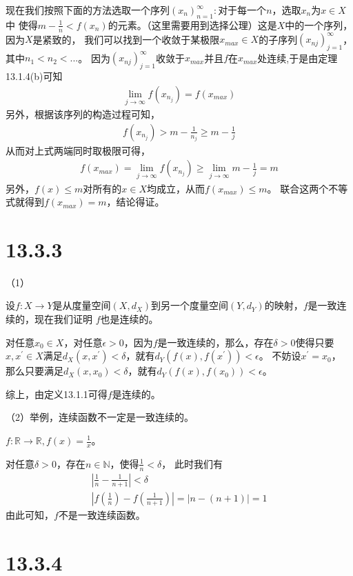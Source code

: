 \documentclass{article}
\begin{document}
现在我们按照下面的方法选取一个序列$(x_n)_{n = 1}^\infty :$对于每一个$n$，选取$x_n$为$x \in X$中
使得$m - \frac{1}{n} < f(x_n)$的元素。（这里需要用到选择公理）这是$X$中的一个序列，因为$X$是紧致的，
我们可以找到一个收敛于某极限$x_{max} \in X$的子序列$(x_{nj})_{j = 1}^\infty$，其中$n_1 < n_2 < ...$。
因为$(x_{nj})_{j = 1}^\infty$收敛于$x_{max}$并且$f$在$x_{max}$处连续,于是由定理13.1.4(b)可知
\begin{align*}
  \lim\limits_{j \to \infty}f(x_{n_j}) = f(x_{max})
\end{align*}
另外，根据该序列的构造过程可知，
\begin{align*}
  f(x_{n_j}) > m - \frac{1}{n_j} \geq m - \frac{1}{j}
\end{align*}
从而对上式两端同时取极限可得，
\begin{align*}
  f(x_{max}) = \lim\limits_{j \to \infty}f(x_{n_j}) \geq \lim\limits_{j \to \infty} m - \frac{1}{j} = m
\end{align*}
另外，$f(x) \leq m$对所有的$x \in X$均成立，从而$f(x_{max}) \leq m$。
联合这两个不等式就得到$f(x_{max}) = m$，结论得证。

\section*{13.3.3}

（1）

设$f : X \to Y$是从度量空间$(X, d_X)$到另一个度量空间$(Y, d_Y)$的映射，$f$是一致连续的，现在我们证明
$f$也是连续的。

对任意$x_0 \in X$，对任意$\epsilon > 0$，因为$f$是一致连续的，那么，存在$\delta > 0$使得只要
$x, x^\prime \in X$满足$d_X(x, x^\prime) < \delta$，就有$d_Y(f(x), f(x^\prime)) < \epsilon$。
不妨设$x^\prime = x_0$，
那么只要满足$d_X(x, x_0) < \delta$，就有$d_Y(f(x), f(x_0)) < \epsilon$。

综上，由定义13.1.1可得$f$是连续的。

（2）举例，连续函数不一定是一致连续的。

$f: \mathbb{R} \to \mathbb{R}, f(x) = \frac{1}{x}$。

对任意$\delta > 0$，存在$n \in \mathbb{N}$，使得$\frac{1}{n} < \delta$，
此时我们有
\begin{align*}
  |\frac{1}{n} - \frac{1}{n+1}| < \delta \\
  |f(\frac{1}{n}) - f(\frac{1}{n + 1})| = |n - (n + 1)| = 1
\end{align*}
由此可知，$f$不是一致连续函数。

\section*{13.3.4}
\end{document}
